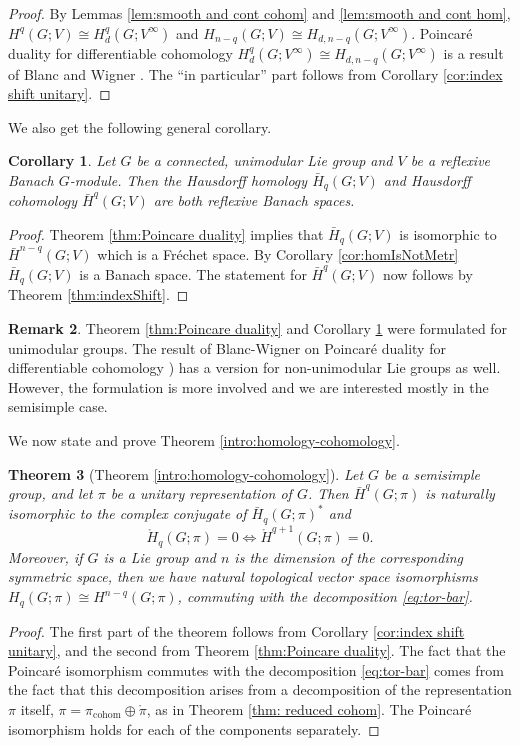 \documentclass[12pt,reqno]{amsart}
\newtheorem{theorem}{Theorem}[section]
\newtheorem{corollary}[theorem]{Corollary}
\theoremstyle{definition}
\newtheorem{remark}[theorem]{Remark}
\newcommand{\torH}{\mathring{H}}
\begin{document}
\begin{proof}
    By Lemmas \ref{lem:smooth and cont cohom} and \ref{lem:smooth and cont hom}, $H^q(G;V)\cong H^q_d(G;V^\infty)$ and $H_{n-q}(G;V)\cong H_{d,n-q}(G;V^\infty)$. Poincar\'e duality for differentiable cohomology $H^q_d(G;V^\infty)\cong H_{d,n-q}(G;V^\infty)$ is  a result of Blanc and Wigner \cite[\S6]{BlancWigner}. The ``in particular'' part follows from Corollary \ref{cor:index shift unitary}.
\end{proof}
We also get the following general corollary.
\begin{corollary}\label{cor:cohom is banach}
     Let $G$ be a connected, unimodular Lie group and $V$ be a reflexive Banach $G$-module. Then the Hausdorff homology $\bar{H}_q(G;V)$ and Hausdorff cohomology $\bar{H}^q(G;V)$ are both reflexive Banach spaces.
\end{corollary}
\begin{proof}
    Theorem \ref{thm:Poincare duality} implies that $\bar{H}_q(G;V)$ is isomorphic to $\bar{H}^{n-q}(G;V)$ which is a Fr\'echet space. By Corollary \ref{cor:homIsNotMetr} $\bar{H}_q(G;V)$ is a Banach space. The statement for $\bar{H}^q(G;V)$ now follows by Theorem \ref{thm:indexShift}.
\end{proof}
\begin{remark}
    Theorem \ref{thm:Poincare duality} and Corollary \ref{cor:cohom is banach} were formulated for unimodular groups. The result of Blanc-Wigner on Poincar\'e duality for differentiable cohomology \cite[\S6]{BlancWigner}) has a version for non-unimodular Lie groups as well. However, the formulation is more involved and we are interested mostly in the semisimple case. 
\end{remark}
We now state and prove Theorem \ref{intro:homology-cohomology}.
\begin{theorem}[Theorem \ref{intro:homology-cohomology}]\label{thm:homology and cohomology}
    Let $G$ be a semisimple group, and let $\pi$ be a unitary representation of $G$.
    Then $\bar{H}^q(G;\pi)$ is naturally isomorphic to the complex conjugate of $\bar{H}_q(G;\pi)^*$ and  
    \[
        \torH_q(G;\pi)=0 \iff \torH^{q+1}(G;\pi)=0.
    \]
    Moreover, if $G$ is a Lie group and $n$ is the dimension of the corresponding symmetric space, then we have natural topological vector space isomorphisms
    $H_q(G;\pi)\cong H^{n-q}(G;\pi)$, commuting with the decomposition \eqref{eq:tor-bar}.
\end{theorem}
\begin{proof}
    The first part of the theorem follows from Corollary \ref{cor:index shift unitary}, and the second from Theorem \ref{thm:Poincare duality}. The fact that the Poincar\'e isomorphism commutes with the decomposition \eqref{eq:tor-bar} comes from the fact that this decomposition arises from a decomposition of the representation $\pi$ itself, $\pi=\pi_\mathrm{cohom} \oplus \mathring\pi$, as in Theorem \ref{thm: reduced cohom}. The Poincar\'e isomorphism holds for each of the components separately.
\end{proof}
\end{document}
